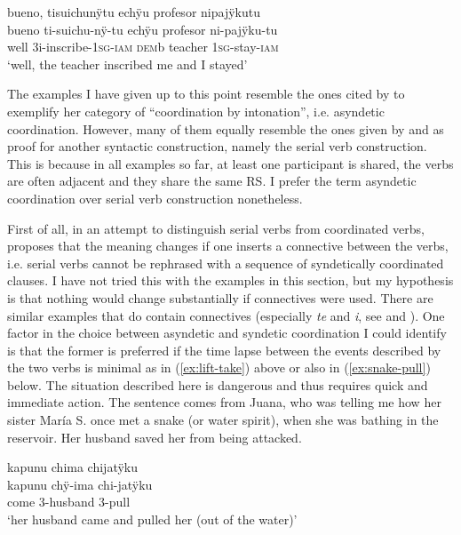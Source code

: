 \ea\label{ex:inscribe-stay}
\begingl
\glpreamble bueno, tisuichunÿtu echÿu profesor nipajÿkutu\\
\gla bueno ti-suichu-nÿ-tu echÿu profesor ni-pajÿku-tu\\
\glb well 3i-inscribe-1\textsc{sg}-\textsc{iam} \textsc{dem}b teacher 1\textsc{sg}-stay-\textsc{iam}\\
\glft ‘well, the teacher inscribed me and I stayed’
\endgl
\trailingcitation{[mxx-p181027l-1.019]}
\xe

The examples I have given up to this point resemble the ones cited by \citet{Mithun1988} to exemplify her category of “coordination by intonation”, i.e. asyndetic coordination. However, many of them equally resemble the ones given by \citet{Aikhenvald2006,Aikhenvald2018} and \citet{Haspelmath2016} as  proof for another syntactic construction, namely the serial verb construction. This is because in all examples so far, at least one participant is shared, the verbs are often adjacent and they share the same RS. I prefer the term asyndetic coordination over serial verb construction nonetheless. 

First of all, in an attempt to distinguish serial verbs from coordinated verbs, \citet[3,24,125-127]{Aikhenvald2018} proposes that the meaning changes if one inserts a connective between the verbs, i.e. serial verbs cannot be rephrased with a sequence of syndetically coordinated clauses. I have not tried this with the examples in this section, but my hypothesis is that nothing would change substantially if connectives were used. There are similar examples that do contain connectives (especially  \textit{te} and  \textit{i}, see  and ). One factor in the choice between asyndetic and syndetic coordination I could identify is that the former is preferred if the time lapse between the events described by the two verbs is minimal as in (\ref{ex:lift-take}) above or also in (\ref{ex:snake-pull}) below. The situation described here is dangerous and thus requires quick and immediate action. The sentence comes from Juana, who was telling me how her sister María S. once met a snake (or water spirit), when she was bathing in the reservoir. Her husband saved her from being attacked.

\ea\label{ex:snake-pull}
\begingl
\glpreamble kapunu chima chijatÿku\\
\gla kapunu chÿ-ima chi-jatÿku\\
\glb come 3-husband 3-pull\\
\glft ‘her husband came and pulled her (out of the water)’
\endgl
\trailingcitation{[jxx-p120515l-2.168]}
\xe

